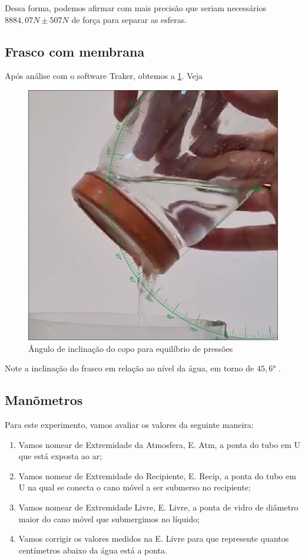     Dessa forma, podemos afirmar com mais precisão que seriam necessários \(8884,07 N \pm 507 N\) de força para separar as esferas. 

\subsection{Frasco com membrana}

    Após análise com o software Traker, obtemos a \cref{copo.png}. Veja
    \begin{figure}[H]
        \centering
        \includegraphics[width=.5\linewidth]{fig/copo.png}
        \caption{Ângulo de inclinação do copo para equilíbrio de pressões}
        \label{copo.png}
    \end{figure}

    Note a inclinação do frasco em relação ao nível da água, em torno de \( 45,6 \)° .

\subsection{Manõmetros}

Para este experimento, vamos avaliar os valores da seguinte maneira:
\begin{enumerate}
    \item Vamos nomear de Extremidade da Atmosfera, E. Atm, a ponta do tubo em U que está exposta ao ar;
    \item Vamos nomear de Extremidade do Recipiente, E. Recip, a ponta do tubo em U na qual se conecta o cano móvel a ser submerso no recipiente;
    \item Vamos nomear de Extremidade Livre, E. Livre, a ponta de vidro de diâmetro maior do cano móvel que submergimos no líquido;
    \item Vamos corrigir os valores medidos na E. Livre para que represente quantos centímetros abaixo da água está a ponta.
\end{enumerate}

